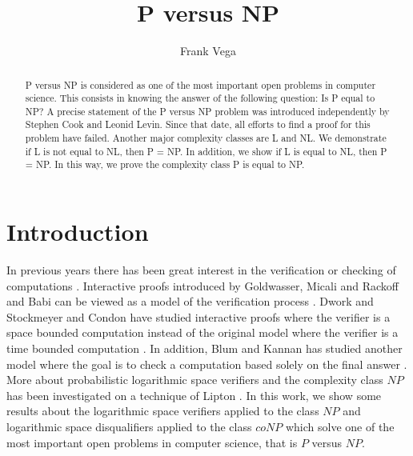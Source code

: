 \documentclass[a4paper,UKenglish,cleveref, autoref]{lipics-v2019}
\title{P versus NP} %
\author{Frank Vega}{Joysonic, Uzun Mirkova 5, Belgrade, 11000, Serbia} {vega.frank@gmail.com}{https://orcid.org/0000-0001-8210-4126}{}
\begin{document}
\maketitle

\begin{abstract}
P versus NP is considered as one of the most important open problems in computer science. This consists in knowing the answer of the following question: Is P equal to NP? A precise statement of the P versus NP problem was introduced independently by Stephen Cook and Leonid Levin. Since that date, all efforts to find a proof for this problem have failed. Another major complexity classes are L and NL. We demonstrate if L is not equal to NL, then P = NP. In addition, we show if L is equal to NL, then P = NP. In this way, we prove the complexity class P is equal to NP.
\end{abstract}

\section{Introduction}

In previous years there has been great interest in the verification or checking of computations \cite{LIP90}. Interactive proofs introduced by Goldwasser, Micali and Rackoff and Babi can be viewed as a model of the verification process \cite{LIP90}. Dwork and Stockmeyer and Condon have studied interactive proofs where the verifier is a space bounded computation instead of the original model where the verifier is a time bounded computation \cite{LIP90}. In addition, Blum and Kannan has studied another model where the goal is to check a computation based solely on the final answer \cite{LIP90}. More about probabilistic logarithmic space verifiers and the complexity class $NP$ has been investigated on a technique of Lipton \cite{LIP90}. In this work, we show some results about the logarithmic space verifiers applied to the class $NP$ and logarithmic space disqualifiers applied to the class $coNP$ which solve one of the most important open problems in computer science, that is $P$ versus $NP$.
\end{document}
